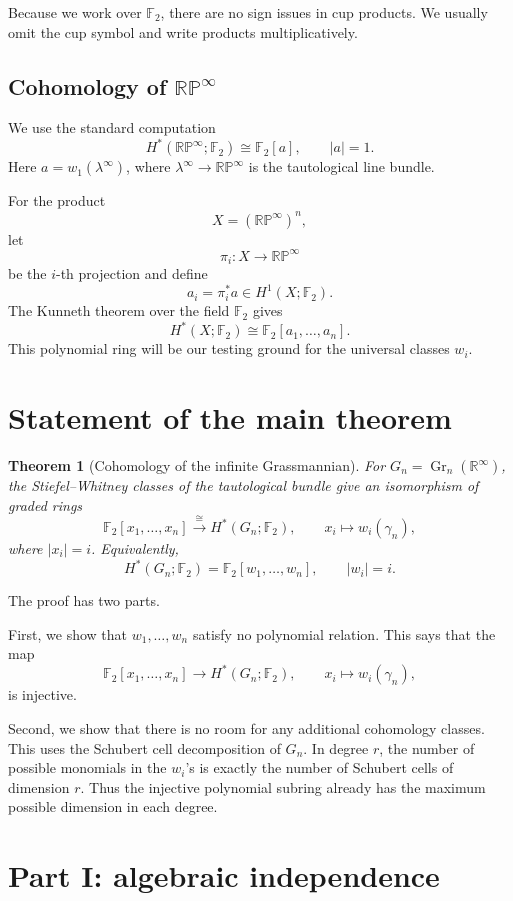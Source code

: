 \documentclass[11pt]{article}
\newtheorem{theorem}{Theorem}[section]
\theoremstyle{remark}
\newcommand{\F}{\mathbb F}
\newcommand{\R}{\mathbb R}
\newcommand{\RP}{\mathbb{RP}}
\newcommand{\Gr}{\operatorname{Gr}}
\newcommand{\Gn}{G_n}
\newcommand{\gamman}{\gamma_n}
\newcommand{\lambdainf}{\lambda^\infty}
\begin{document}
Because we work over $\F_2$, there are no sign issues in cup products.  We usually omit the cup symbol and write products multiplicatively.

\subsection{Cohomology of $\RP^\infty$}

We use the standard computation
\[
  H^*(\RP^\infty;\F_2)\cong \F_2[a],\qquad |a|=1.
\]
Here $a=w_1(\lambdainf)$, where $\lambdainf\to \RP^\infty$ is the tautological line bundle.

For the product
\[
  X=(\RP^\infty)^n,
\]
let
\[
  \pi_i:X\to \RP^\infty
\]
be the $i$-th projection and define
\[
  a_i=\pi_i^*a\in H^1(X;\F_2).
\]
The Kunneth theorem over the field $\F_2$ gives
\[
  H^*(X;\F_2)\cong \F_2[a_1,\dots,a_n].
\]
This polynomial ring will be our testing ground for the universal classes $w_i$.

\section{Statement of the main theorem}

\begin{theorem}[Cohomology of the infinite Grassmannian]\label{thm:main}
For $\Gn=\Gr_n(\R^\infty)$, the Stiefel--Whitney classes of the tautological bundle give an isomorphism of graded rings
\[
  \F_2[x_1,\dots,x_n]\xrightarrow{\ \cong\ }H^*(\Gn;\F_2),
  \qquad x_i\longmapsto w_i(\gamman),
\]
where $|x_i|=i$.  Equivalently,
\[
  H^*(\Gn;\F_2)=\F_2[w_1,
  \dots,w_n],\qquad |w_i|=i.
\]
\end{theorem}

The proof has two parts.

First, we show that $w_1,\dots,w_n$ satisfy no polynomial relation.  This says that the map
\[
  \F_2[x_1,\dots,x_n]\longrightarrow H^*(\Gn;\F_2),
  \qquad x_i\longmapsto w_i(\gamman),
\]
is injective.

Second, we show that there is no room for any additional cohomology classes.  This uses the Schubert cell decomposition of $\Gn$.  In degree $r$, the number of possible monomials in the $w_i$'s is exactly the number of Schubert cells of dimension $r$.  Thus the injective polynomial subring already has the maximum possible dimension in each degree.

\section{Part I: algebraic independence}
\end{document}
